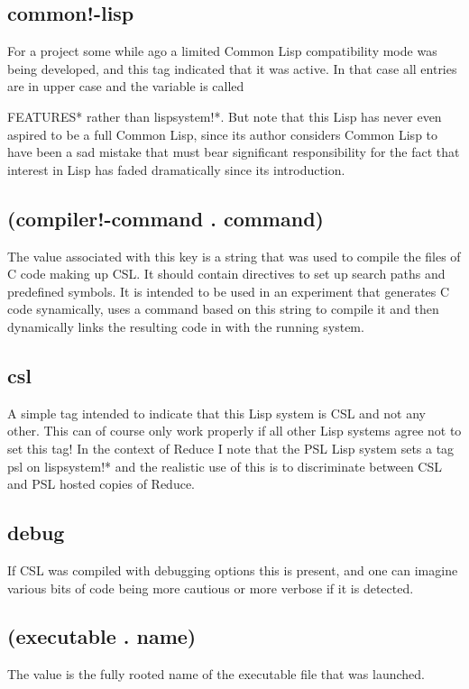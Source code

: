 \documentclass[a4paper,11pt]{article}
\begin{document}
\subsection{\ttfamily common!-lisp}
For a project some while ago a limited Common Lisp compatibility mode was
being developed, and this tag indicated that it was active. In that case all
entries are in upper case and the variable is called {\ttfamily *FEATURES*
rather than {\ttfamily lispsystem!*}. But note that this Lisp has never even
aspired to be a full Common Lisp, since its author considers Common Lisp to
have been a sad mistake that must bear significant responsibility for the
fact that interest in Lisp has faded dramatically since its introduction.
  

\subsection{\ttfamily (compiler!-command . command)}
The value associated with this key is a string that was used to compile the
files of C code making up CSL. It should contain directives to set up
search paths and predefined symbols. It is intended to be used in an
experiment that generates C code synamically, uses a command based on this
string to compile it and then dynamically links the resulting code in with
the running system.

\subsection{\ttfamily csl}
A simple tag intended to indicate that this Lisp system is CSL and not any
other. This can of course only work properly if all other Lisp systems
agree not to set this tag! In the context of Reduce I note that the PSL
Lisp system sets a tag {\ttfamily psl} on {\ttfamily lispsystem!*} and
the realistic use of this is to discriminate between CSL and PSL hosted
copies of Reduce.

\subsection{\ttfamily debug}
If CSL was compiled with debugging options this is present, and one can imagine
various bits of code being more cautious or more verbose if it is detected.

\subsection{\ttfamily (executable . name)}
The value is the fully rooted name of the executable file that was launched.

}
\end{document}
